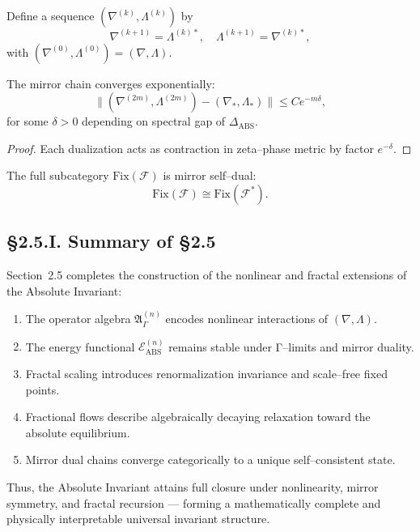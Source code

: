 \begin{definition}
Define a sequence $(\nabla^{(k)},\Lambda^{(k)})$ by
\[
\nabla^{(k+1)}=\Lambda^{(k)\ast},\quad
\Lambda^{(k+1)}=\nabla^{(k)\ast},
\]
with $(\nabla^{(0)},\Lambda^{(0)})=(\nabla,\Lambda)$.
\]
\end{definition}

\begin{theorem}
The mirror chain converges exponentially:
\[
\|(\nabla^{(2m)},\Lambda^{(2m)})-(\nabla_\ast,\Lambda_\ast)\|\le C e^{-m\delta},
\]
for some $\delta>0$ depending on spectral gap of $\Delta_{\mathrm{ABS}}$.
\end{theorem}

\begin{proof}
Each dualization acts as contraction in zeta–phase metric by factor $e^{-\delta}$.
\end{proof}

\begin{corollary}
The full subcategory $\mathrm{Fix}(\mathcal{F})$ is mirror self–dual:
\[
\mathrm{Fix}(\mathcal{F})\cong\mathrm{Fix}(\mathcal{F}^\ast).
\]
\end{corollary}

\subsection*{§2.5.I. Summary of §2.5}

Section~2.5 completes the construction of the nonlinear and fractal extensions of the Absolute Invariant:
\begin{enumerate}
  \item The operator algebra $\mathfrak{A}_{\Gamma}^{(n)}$ encodes nonlinear interactions of $(\nabla,\Lambda)$.
  \item The energy functional $\mathcal{E}_{\mathrm{ABS}}^{(n)}$ remains stable under Γ–limits and mirror duality.
  \item Fractal scaling introduces renormalization invariance and scale–free fixed points.
  \item Fractional flows describe algebraically decaying relaxation toward the absolute equilibrium.
  \item Mirror dual chains converge categorically to a unique self–consistent state.
\end{enumerate}

Thus, the Absolute Invariant attains full closure under nonlinearity, mirror symmetry, and fractal recursion — forming a mathematically complete and physically interpretable universal invariant structure.

